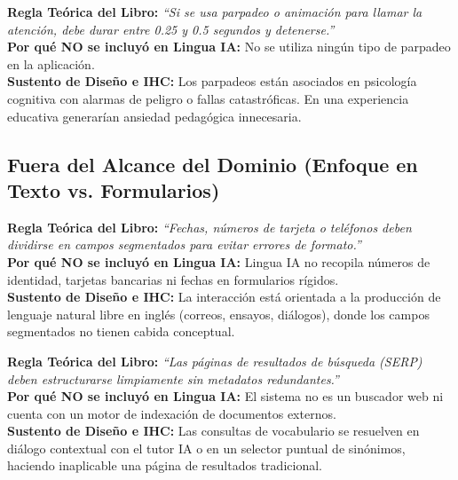 \documentclass[10pt,a4paper]{article}
\begin{document}
\begin{tcolorbox}[excludedbox, title={C5.7 -- Mantener el movimiento o parpadeo breve \hfill \colorbox{linguaRed}{\scriptsize\textbf{EXCLUIDO}}}]
\small
\textbf{Regla Teórica del Libro:} \textit{``Si se usa parpadeo o animación para llamar la atención, debe durar entre 0.25 y 0.5 segundos y detenerse.''}\\
\textbf{Por qué NO se incluyó en Lingua IA:} No se utiliza ningún tipo de parpadeo en la aplicación.\\
\textbf{Sustento de Diseño e IHC:} Los parpadeos están asociados en psicología cognitiva con alarmas de peligro o fallas catastróficas. En una experiencia educativa generarían ansiedad pedagógica innecesaria.
\end{tcolorbox}


\subsection*{Fuera del Alcance del Dominio (Enfoque en Texto vs. Formularios)}

\begin{tcolorbox}[excludedbox, title={C3.6 -- Usar campos segmentados cuando reduzcan errores \hfill \colorbox{linguaRed}{\scriptsize\textbf{EXCLUIDO}}}]
\small
\textbf{Regla Teórica del Libro:} \textit{``Fechas, números de tarjeta o teléfonos deben dividirse en campos segmentados para evitar errores de formato.''}\\
\textbf{Por qué NO se incluyó en Lingua IA:} Lingua IA no recopila números de identidad, tarjetas bancarias ni fechas en formularios rígidos.\\
\textbf{Sustento de Diseño e IHC:} La interacción está orientada a la producción de lenguaje natural libre en inglés (correos, ensayos, diálogos), donde los campos segmentados no tienen cabida conceptual.
\end{tcolorbox}

\begin{tcolorbox}[excludedbox, title={C3.9 -- Evitar el ruido en los resultados de búsqueda \hfill \colorbox{linguaRed}{\scriptsize\textbf{EXCLUIDO}}}]
\small
\textbf{Regla Teórica del Libro:} \textit{``Las páginas de resultados de búsqueda (SERP) deben estructurarse limpiamente sin metadatos redundantes.''}\\
\textbf{Por qué NO se incluyó en Lingua IA:} El sistema no es un buscador web ni cuenta con un motor de indexación de documentos externos.\\
\textbf{Sustento de Diseño e IHC:} Las consultas de vocabulario se resuelven en diálogo contextual con el tutor IA o en un selector puntual de sinónimos, haciendo inaplicable una página de resultados tradicional.
\end{tcolorbox}
\end{document}
